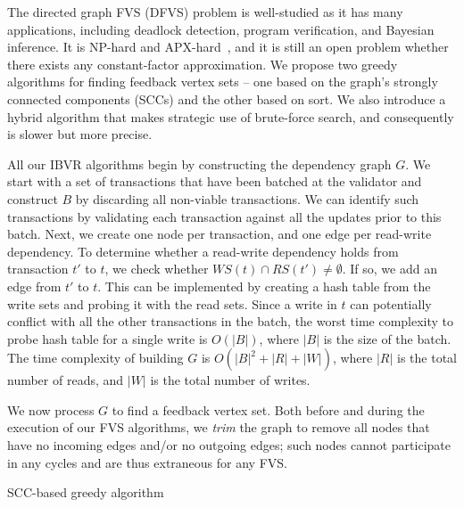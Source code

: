 The directed graph FVS (DFVS) problem is well-studied as it has many applications, including deadlock detection, program verification, and Bayesian inference. It is NP-hard and APX-hard~\cite{kann1992approximability, karp1972reducibility}, and it is still an open problem whether there exists any constant-factor approximation.
We propose two greedy algorithms for finding feedback vertex sets -- one based on the graph's strongly connected components (SCCs) and the other based on sort. We also introduce a hybrid algorithm that makes strategic use of brute-force search, and consequently is slower but more precise.

All our IBVR algorithms begin by constructing the dependency graph $G$. We start with a set of transactions that have been batched at the validator and construct $B$ by discarding all non-viable transactions. We can identify such transactions by validating each transaction against all the updates prior to this batch.
Next, we create one node per transaction, and one edge per read-write dependency. To determine whether a read-write dependency holds from transaction $t'$ to $t$, we check whether $WS(t) \cap RS(t') \neq \emptyset$. If so, we add an edge from $t'$ to $t$. This can be implemented by creating a hash table from the write sets and probing it with the read sets. Since a write in $t$ can potentially conflict with all the other transactions in the batch, the worst time complexity to probe hash table for a single write is $O(|B|)$, where $|B|$ is the size of the batch. The time complexity of building $G$ is $O(|B|^2+|R|+|W|)$, where $|R|$ is the total number of reads, and $|W|$ is the total number of writes. 

We now process $G$ to find a feedback vertex set. Both before and during the
execution of our FVS algorithms, we \emph{trim} the graph to remove all nodes
that have no incoming edges and/or no outgoing edges; such nodes cannot
participate in any cycles and are thus extraneous for any FVS.

\begin{algorithm}[t]
\SetAlgoLined\DontPrintSemicolon
{}


\caption{SCC-based greedy algorithm}
\label{alg:scc}
\end{algorithm}


